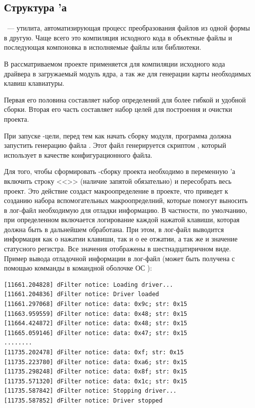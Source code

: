 \subsection{Структура 'а}
~--- утилита, автоматизирующая процесс преобразования файлов из одной формы в другую. Чаще всего 
это компиляция исходного кода в объектные файлы и последующая компоновка в исполняемые файлы или библиотеки.
\newpar

В рассматриваемом проекте  применяется для компиляции исходного кода драйвера в загружаемый модуль ядра, а 
так же для генерации карты необходимых клавиш клавиатуры.
\newpar

Первая его половина составляет набор определений для более гибкой и удобной сборки.
Вторая его часть составляет набор целей для построения и очистки проекта.
\newpar

При запуске -цели, перед тем как начать сборку модуля,
программа  должна запустить генерацию файла .
Этот файл генерируется скриптом , который использует
 в качестве конфигурационного файла.
\newpar

Для того, чтобы сформировать -сборку проекта необходимо в 
переменную  'а включить строку <<>> (наличие запятой обязательно) 
и пересобрать весь проект. Это действие создаст макроопределение  в проекте, что приведет
к созданию набора вспомогательных макроопределний, которые помогут выносить в 
лог-файл необходимую для отладки информацию. В частности, по умолчанию, при
определенном  включается логирование каждой нажатой клавиши, которая 
должна быть в дальнейшем обработана.
При этом, в лог-файл выводится информация как о нажатии клавиши, так и о ее отжатии, а 
так же и значение статусного регистра. Все значения отображены в шестнадцатиричном виде.
Пример вывода отладочной информации в лог-файл (может быть получена с помощью комманды
 в командной оболочке ОС \linux):
\begin{verbatim}
[11661.204828] dFilter notice: Loading driver...
[11661.204836] dFilter notice: Driver loaded
[11661.297068] dFilter notice: data: 0x9c; str: 0x15
[11663.959559] dFilter notice: data: 0x48; str: 0x15
[11664.424872] dFilter notice: data: 0x48; str: 0x15
[11665.059146] dFilter notice: data: 0x47; str: 0x15
........
[11735.202478] dFilter notice: data: 0xf; str: 0x15
[11735.223780] dFilter notice: data: 0xa6; str: 0x15
[11735.298248] dFilter notice: data: 0x8f; str: 0x15
[11735.571320] dFilter notice: data: 0x1c; str: 0x15
[11735.587842] dFilter notice: Stopping driver...
[11735.587852] dFilter notice: Driver stopped
\end{verbatim}

